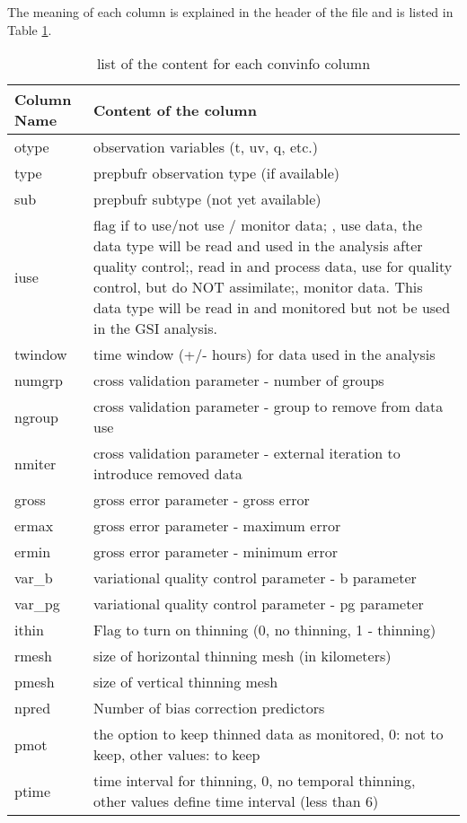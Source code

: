 \begin{enumerate}[leftmargin=*]
\begin{itemize}[leftmargin=*]
The meaning of each column is explained in the header of the file and is listed in Table \ref{tab43}. \\

\begin{table}[htbp]
\centering
\caption{list of the content for each convinfo column}
\begin{tabular}{|p{2cm}|p{14cm}|}
\hline
\hline
Column Name & Content of the column \\
\hline
otype & observation variables (t, uv, q, etc.) \\
\hline
type & prepbufr observation type (if available) \\
\hline
sub	& prepbufr subtype (not yet available) \\
\hline
iuse & flag if to use/not use / monitor data; \newline
=1, use data, the data type will be read and used in the analysis after quality control;\newline
=0, read in and process data, use for quality control, but do NOT assimilate;\newline
=-1, monitor data. This data type will be read in and monitored but not be used in the GSI analysis. \\
\hline
twindow	& time window (+/- hours) for data used in the analysis \\
\hline
numgrp & cross validation parameter - number of groups \\
\hline
ngroup & cross validation parameter - group to remove from data use \\
\hline
nmiter & cross validation parameter - external iteration to introduce removed data \\
\hline
gross & gross error parameter  - gross error \\
\hline
ermax & gross error parameter - maximum error \\
\hline
ermin & gross error parameter - minimum error \\
\hline
var\_b & variational quality control parameter  -  b parameter \\
\hline
var\_pg & variational quality control parameter  -  pg parameter\\
\hline
ithin & Flag to turn on thinning (0, no thinning, 1 - thinning) \\
\hline
rmesh & size of horizontal thinning mesh (in kilometers) \\
\hline
pmesh & size of vertical thinning mesh \\
\hline
npred & Number of bias correction predictors \\
\hline
pmot & the option to keep thinned data as monitored, 0: not to keep, other values: to keep \\
\hline
ptime & time interval for thinning, 0, no temporal thinning, other values define time interval (less than 6) \\
\hline
\end{tabular}
\label{tab43}
\end{table} 


\end{itemize}
\end{enumerate}
